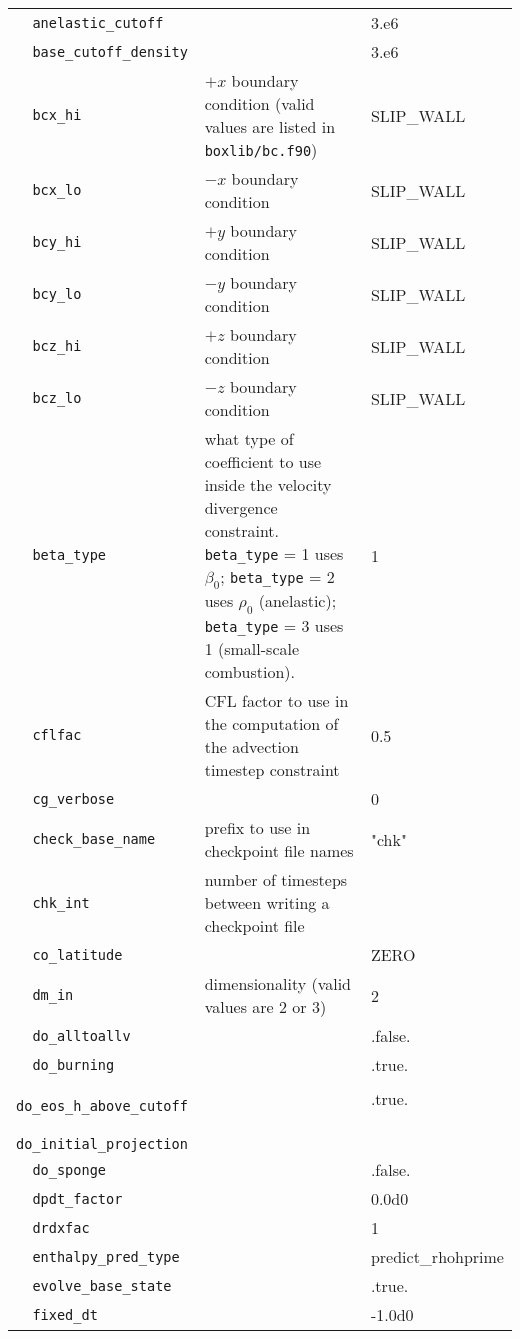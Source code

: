 {\begin{center}
\begin{longtable}{|l|p{3.25in}|l|}
\verb=  anelastic_cutoff =  &   &  3.e6 \\
\verb=  base_cutoff_density =  &   &  3.e6 \\
\verb=  bcx_hi =  & $+x$ boundary condition (valid values are listed in {\tt  boxlib/bc.f90})  &  SLIP\_WALL \\
\verb=  bcx_lo =  & $-x$ boundary condition  &  SLIP\_WALL \\
\verb=  bcy_hi =  & $+y$ boundary condition  &  SLIP\_WALL \\
\verb=  bcy_lo =  & $-y$ boundary condition  &  SLIP\_WALL \\
\verb=  bcz_hi =  & $+z$ boundary condition  &  SLIP\_WALL \\
\verb=  bcz_lo =  & $-z$ boundary condition  &  SLIP\_WALL \\
\verb=  beta_type =  & what type of coefficient to use inside the velocity divergence constraint.  
                       {\tt beta\_type} = 1 uses $\beta_0$; {\tt beta\_type} = 2 uses $\rho_0$ (anelastic);
                       {\tt beta\_type} = 3 uses 1 (small-scale combustion).  &  1 \\
\verb=  cflfac =  & CFL factor to use in the computation of the advection timestep constraint  &  0.5 \\
\verb=  cg_verbose =  &   &  0 \\
\verb=  check_base_name =  & prefix to use in checkpoint file names  &  "chk" \\
\verb=  chk_int =  & number of timesteps between writing a checkpoint file  &  \\
\verb=  co_latitude =  &   &  ZERO \\
\verb=  dm_in =  & dimensionality (valid values are 2 or 3)  &  2 \\
\verb=  do_alltoallv =  &   &  .false. \\
\verb=  do_burning =  &   &  .true. \\
\verb=  do_eos_h_above_cutoff =  &   &  .true. \\
\verb=  do_initial_projection =  &   &  \\
\verb=  do_sponge =  &   &  .false. \\
\verb=  dpdt_factor =  &   &  0.0d0 \\
\verb=  drdxfac =  &   &  1 \\
\verb=  enthalpy_pred_type =  &   &  predict\_rhohprime \\
\verb=  evolve_base_state =  &   &  .true. \\
\verb=  fixed_dt =  &   &  -1.0d0 \\

\end{longtable}
\end{center}}
